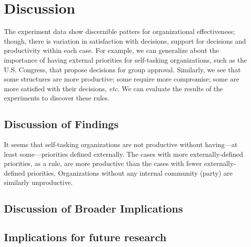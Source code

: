 \documentclass[pdftex,12pt]{llncs}
\begin{document}
\section{Discussion}
%
The experiment data show discernible patters for organizational effectiveness; though, there is variation in satisfaction with decisions, support for decisions and productivity within each case.
For example, we can generalize about the importance of having external priorities for self-tasking organizations, such as the U.S. Congress, that propose decisions for group approval. 
Similarly, we see that some structures are more productive; some require more compromise; some are more satisfied with their decisions, \textit{etc}. 
We can evaluate the results of the experiments to discover these rules. 

\subsection{Discussion of Findings}


It seems that self-tasking organizations are not productive without having---at least some---priorities defined externally. 
The cases with more externally-defined priorities, as a rule, are more productive than the cases with fewer externally-defined priorities.  
Organizations without any internal community (party) are similarly unproductive. 



\subsection{Discussion of Broader Implications}


\subsection{Implications for future research}
\end{document}
